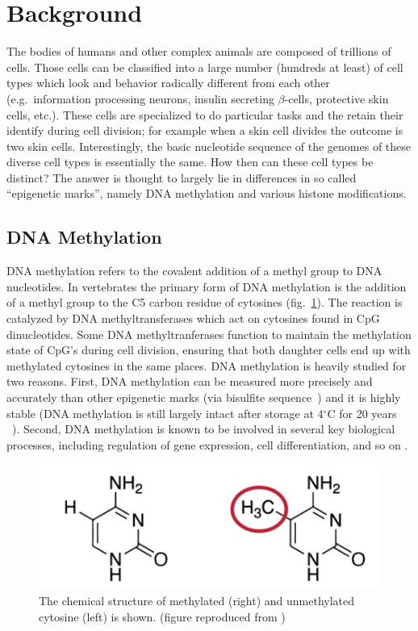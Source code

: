 \hspace{24pt}

\section{Background}
The bodies of humans and other complex animals are composed of trillions of cells.  Those cells can be classified into a large number (hundreds at least) of cell types which look and behavior radically different from each other (e.g.\ information processing neurons, insulin secreting $\beta$-cells, protective skin cells, etc.).  These cells are specialized to do particular tasks and the retain their identify during cell division; for example when a skin cell divides the outcome is two skin cells.  Interestingly, the basic nucleotide sequence of the genomes of these diverse cell types is essentially the same.  How then can these cell types be distinct?  The answer is thought to largely lie in differences in so called ``epigenetic marks'', namely DNA methylation and various histone modifications.

\subsection{DNA Methylation}
DNA methylation refers to the covalent addition of a methyl group to DNA nucleotides.
In vertebrates the primary form of DNA methylation is the addition of a methyl group to the C5 carbon residue of cytosines (fig.~\ref{f2}).  The reaction is catalyzed by DNA methyltransferases which act on cytosines found in CpG dinucleotides.  Some DNA methyltranferases function to maintain the methylation state of CpG's during cell division, ensuring that both daughter cells end up with methylated cytosines in the same places.  DNA methylation is heavily studied for two reasons.  First, DNA methylation can be measured more precisely and accurately than other epigenetic marks (via bisulfite sequence~\cite{frommer1992bisulfite}) and it is highly stable (DNA methylation is still largely intact after storage at 4$^{\circ}$C for 20 years ~\cite{li2018stability}).  Second, DNA methylation is known to be involved in several key biological processes, including regulation of gene expression, cell differentiation, and so on \cite{krueger2012dna}.

\begin{figure}[ht]
    \centering
    \includegraphics[width=0.8\columnwidth]{body/figure/figure2.png}
    \captionsetup{labelfont=bf}
    \renewcommand{\baselinestretch}{1.0}
    \caption[An illustration of DNA methylation]{The chemical structure of methylated (right) and unmethylated cytosine (left) is shown. (figure reproduced from \cite{enwiki:1028802025})}
    \label{f2}
\end{figure}


